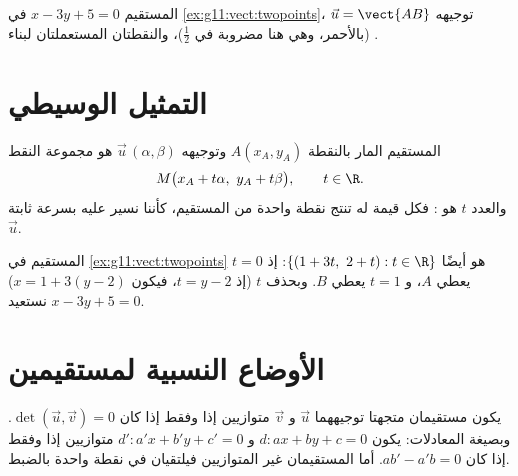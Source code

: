 \begin{omfigure}

{\small المستقيم $x - 3y + 5 = 0$ في \cref{ex:g11:vect:twopoints}، 
توجيهه $\vec u = \vect{AB}$ (بالأحمر، وهي هنا مضروبة في $\frac12$)،
والنقطتان المستعملتان لبناء .}
\end{omfigure}

\section{التمثيل الوسيطي}

\begin{definition}\label{def:g11:vect:parametric}
المستقيم المار بالنقطة $A(x_A, y_A)$ وتوجيهه $\vec u\,(\alpha, \beta)$ هو
مجموعة النقط
\[
M\bigl(x_A + t\alpha,\ y_A + t\beta\bigr), \qquad t \in \R .
\]
والعدد $t$ هو \emph{}: فكل قيمة له تنتج نقطة
واحدة من المستقيم، كأننا نسير عليه بسرعة ثابتة $\vec u$.
\end{definition}

\begin{example}
المستقيم في \cref{ex:g11:vect:twopoints} هو أيضًا
$\{(1 + 3t,\ 2 + t) : t \in \R\}$: إذ $t = 0$ يعطي $A$، و $t = 1$ يعطي $B$.
وبحذف $t$ (إذ $t = y - 2$، فيكون $x = 1 + 3(y-2)$) نستعيد
$x - 3y + 5 = 0$.
\end{example}

\section{الأوضاع النسبية لمستقيمين}

\begin{proposition}\label{prop:g11:vect:positions}
يكون مستقيمان متجهتا توجيههما $\vec u$ و $\vec v$ متوازيين إذا وفقط
إذا كان $\det(\vec u, \vec v) = 0$. وبصيغة المعادلات: يكون $d : ax + by + c =
0$ و $d' : a'x + b'y + c' = 0$ متوازيين إذا وفقط إذا كان
$ab' - a'b = 0$. أما المستقيمان غير المتوازيين فيلتقيان في نقطة واحدة بالضبط.
\end{proposition}


